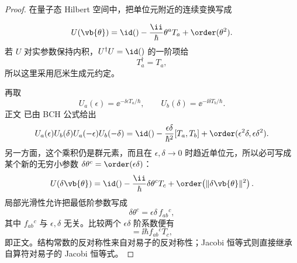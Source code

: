 \begin{proof}
在量子态 Hilbert 空间中，把单位元附近的连续变换写成

\begin{equation*}
 U(\vb{\theta})
 =\id()-\frac{\ii}{\hbar}\theta^aT_a+
 \order(\theta^2).
\end{equation*}
若 $U$ 对实参数保持内积，$U^\dagger U=\id()$ 的一阶项给
\begin{equation*}
 T_a^\dagger=T_a,
\end{equation*}
所以这里采用厄米生成元约定。

再取
\begin{equation*}
 U_a(\epsilon)=\ee^{-\ii\epsilon T_a/\hbar},
 \qquad
 U_b(\delta)=\ee^{-\ii\delta T_b/\hbar}.
\end{equation*}
正文 已由 BCH 公式给出
\begin{equation*}
 U_a(\epsilon)U_b(\delta)U_a(-\epsilon)U_b(-\delta)
 =\id()-\frac{\epsilon\delta}{\hbar^2}[T_a,T_b]+
 \order(\epsilon^2\delta,\epsilon\delta^2).
\end{equation*}
另一方面，这个乘积仍是群元素，而且在 $\epsilon,\delta\to0$ 时趋近单位元，所以必可写成某个新的无穷小参数 $\delta\theta^c=\order(\epsilon\delta)$：
\begin{equation*}
 U(\delta\vb{\theta})
 =\id()-\frac{\ii}{\hbar}\delta\theta^cT_c+
 \order\!\left(\|\delta\vb{\theta}\|^2\right).
\end{equation*}
局部光滑性允许把最低阶参数写成
\begin{equation*}
 \delta\theta^c=\epsilon\delta\,f_{ab}{}^c,
\end{equation*}
其中 $f_{ab}{}^c$ 与 $\epsilon,\delta$ 无关。比较两个 $\epsilon\delta$ 阶系数便有
\begin{equation*}
 [T_a,T_b]=\ii\hbar f_{ab}{}^cT_c,
\end{equation*}
即正文。结构常数的反对称性来自对易子的反对称性；Jacobi 恒等式则直接继承自算符对易子的 Jacobi 恒等式。
\end{proof}
